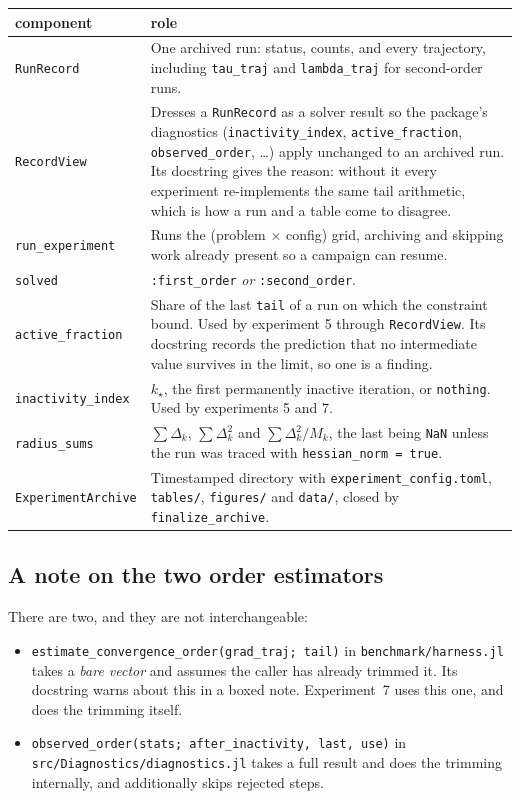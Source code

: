 \documentclass[11pt,a4paper]{article}
\newcommand{\jl}[1]{\texttt{\small #1}}
\newcommand{\file}[1]{\texttt{\small #1}}
\begin{document}
\begin{longtable}{@{}p{40mm}p{106mm}@{}}
\toprule
\textbf{component} & \textbf{role} \\
\midrule
\endhead
\jl{RunRecord} &
One archived run: status, counts, and every trajectory, including
\jl{tau\_traj} and \jl{lambda\_traj} for second-order runs. \\[3pt]
\jl{RecordView} &
Dresses a \jl{RunRecord} as a solver result so the package's diagnostics
(\jl{inactivity\_index}, \jl{active\_fraction}, \jl{observed\_order}, \dots) apply
unchanged to an archived run. Its docstring gives the reason: without it every
experiment re-implements the same tail arithmetic, which is how a run and a table
come to disagree. \\[3pt]
\jl{run\_experiment} &
Runs the (problem $\times$ config) grid, archiving and skipping work already
present so a campaign can resume. \\[3pt]
\jl{solved} &
\jl{:first\_order} \emph{or} \jl{:second\_order}. \\[3pt]
\jl{active\_fraction} &
Share of the last \jl{tail} of a run on which the constraint bound. Used by
experiment 5 through \jl{RecordView}. Its docstring records the prediction that no
intermediate value survives in the limit, so one is a finding. \\[3pt]
\jl{inactivity\_index} &
$k_\star$, the first permanently inactive iteration, or \jl{nothing}. Used by
experiments 5 and 7. \\[3pt]
\jl{radius\_sums} &
$\sum\Delta_k$, $\sum\Delta_k^2$ and $\sum\Delta_k^2/M_k$, the last being \jl{NaN}
unless the run was traced with \jl{hessian\_norm = true}. \\[3pt]
\jl{ExperimentArchive} &
Timestamped directory with \file{experiment\_config.toml}, \file{tables/},
\file{figures/} and \file{data/}, closed by \jl{finalize\_archive}. \\
\bottomrule
\end{longtable}

\subsection*{A note on the two order estimators}

There are two, and they are not interchangeable:

\begin{itemize}[leftmargin=6mm,itemsep=2pt]
  \item \jl{estimate\_convergence\_order(grad\_traj; tail)} in
        \file{benchmark/harness.jl} takes a \emph{bare vector} and assumes the
        caller has already trimmed it. Its docstring warns about this in a boxed
        note. Experiment~7 uses this one, and does the trimming itself.
  \item \jl{observed\_order(stats; after\_inactivity, last, use)} in
        \file{src/Diagnostics/diagnostics.jl} takes a full result and does the
        trimming internally, and additionally skips rejected steps.
\end{itemize}
\end{document}
